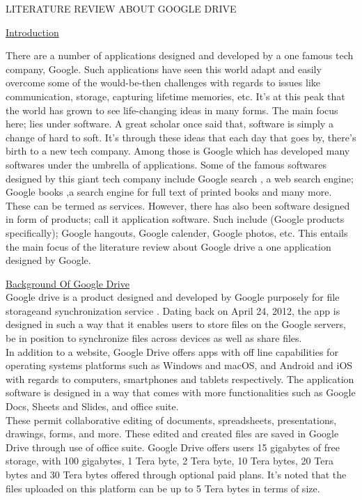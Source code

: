 \documentclass[]{report}
\title{}
\author{KIZITO SEBUTEMBA EZEKIEL	213012200		13/U/6970/EVE}
\begin{document}
\maketitle LITERATURE REVIEW ABOUT GOOGLE DRIVE


\begin{flushleft}
	\underline{Introduction}\linebreak
	
	There are a number of applications designed and developed by a one famous tech company, Google. Such applications have seen this world adapt and easily overcome some of the would-be-then challenges with regards to issues like communication, storage, capturing lifetime memories, etc. It’s at this peak that the world has grown to see life-changing ideas in many forms. The main focus here; lies under software.\linebreak
	 A great scholar once said\cite{1} that, software is simply a change of hard to soft. It’s through these ideas that each day that goes by, there’s birth to a new tech company. Among those is  Google which has developed many softwares under the umbrella of applications\cite{2}.\linebreak
	Some of the famous softwares designed by this giant tech company include Google search \cite{3}, a web search engine; Google books\cite{4} ,a search engine for full text of printed books and many more. These can be termed as services. However, there has also been software designed in form of products; call it application software\cite{5}. Such include (Google products specifically); Google hangouts, Google calender, Google photos\cite{6}, etc. This entails the main focus of the literature review about Google drive a one application designed by Google.\linebreak
	
	\underline{Background Of Google Drive}\\
	Google drive is a product designed and developed by Google purposely for file storage\cite{7}and synchronization service\cite{8} . Dating back on April 24, 2012, the app is designed in such a way that it enables users to store files on the Google servers, be in position to synchronize files across devices as well as share files.\\
	In addition to a website, Google Drive offers apps with off line capabilities for operating systems platforms such as Windows and macOS, and Android and iOS with regards to computers, smartphones and tablets respectively. The application software is designed in a way that comes with more functionalities such as Google Docs, Sheets and Slides, and office suite\cite{9}.\\ These permit collaborative editing of documents, spreadsheets, presentations, drawings, forms, and more\cite{10}. These edited and created files are saved in Google Drive through use of office suite.
	Google Drive offers users 15 gigabytes of free storage, with 100 gigabytes, 1 Tera byte, 2 Tera byte, 10 Tera bytes, 20 Tera bytes and 30 Tera bytes offered through optional paid plans. It’s noted that the files uploaded on this platform can be up to 5 Tera bytes in terms of size.\cite{10}\linebreak
	

\end{flushleft}
\end{document}
